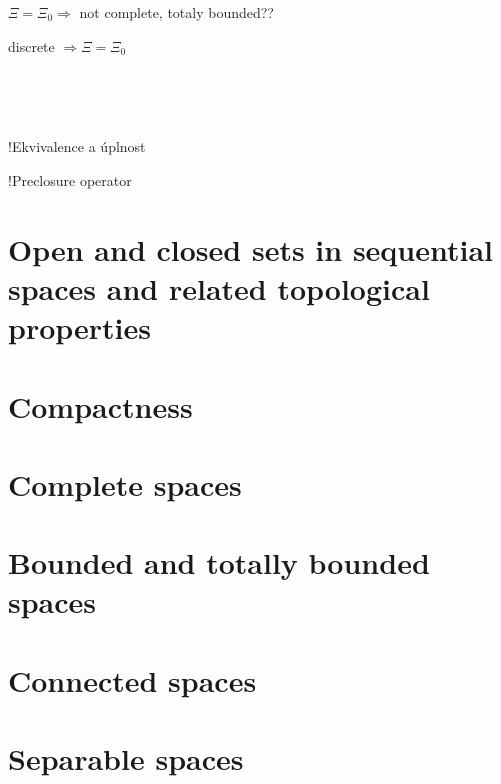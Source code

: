 $\Xi=\Xi_0 \Rightarrow$ not complete, totaly bounded??

discrete $\Rightarrow \Xi=\Xi_0$


\

\

!Ekvivalence a úplnost

!Preclosure operator


\section{Open and closed sets in sequential spaces and related topological properties}

\section{Compactness}

\section{Complete spaces}

\section{Bounded and totally bounded spaces}

\section{Connected spaces}

\section{Separable spaces}
